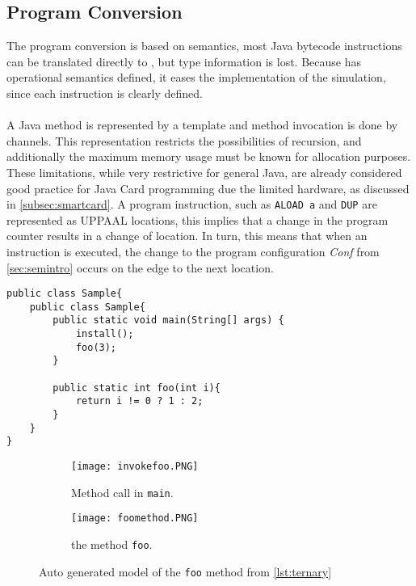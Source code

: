 \subsection{Program Conversion}\label{sec:programConversion}
The program conversion is based on \jcl semantics, most Java bytecode instructions can be translated directly to \jcl, but type information is lost. Because \jcl has operational semantics defined, it eases the implementation of the simulation, since each instruction is clearly defined.\\\\
A Java method is represented by a template and method invocation is done by channels. This representation restricts the possibilities of recursion, and additionally the maximum memory usage must be known for allocation purposes. 
These limitations, while very restrictive for general Java, are already considered good practice for Java Card programming due the limited hardware, as discussed in \cref{subsec:smartcard}.
A program instruction, such as \texttt{ALOAD a} and \texttt{DUP} are represented as UPPAAL locations, this implies that a change in the program counter results in a change of location. 
In turn, this means that when an instruction is executed, the change to the program configuration \textit{Conf} from \cref{sec:semintro} occurs on the edge to the next location.

\begin{minipage}{\linewidth}
\begin{lstlisting}[caption={Java code sample to be converted to a UPPAAL model.}, label={lst:ternary}]
public class Sample{
    public class Sample{
        public static void main(String[] args) {
            install();
            foo(3);
        }
        
        public static int foo(int i){
            return i != 0 ? 1 : 2;
        }
    }
}
\end{lstlisting}
\end{minipage}

\begin{figure}
\begin{subfigure}{\textwidth}
	\texttt{[image: invokefoo.PNG]}
	\caption{Method call in \texttt{main}.}
\end{subfigure}
\begin{subfigure}{\textwidth}
	\texttt{[image: foomethod.PNG]}
	\caption{the method \texttt{foo}.}
	\label{fig:uppaal3}
\end{subfigure}

\caption{Auto generated model of the \texttt{foo} method from \cref{lst:ternary}}
\label{fig:fooMethod}
\end{figure}


